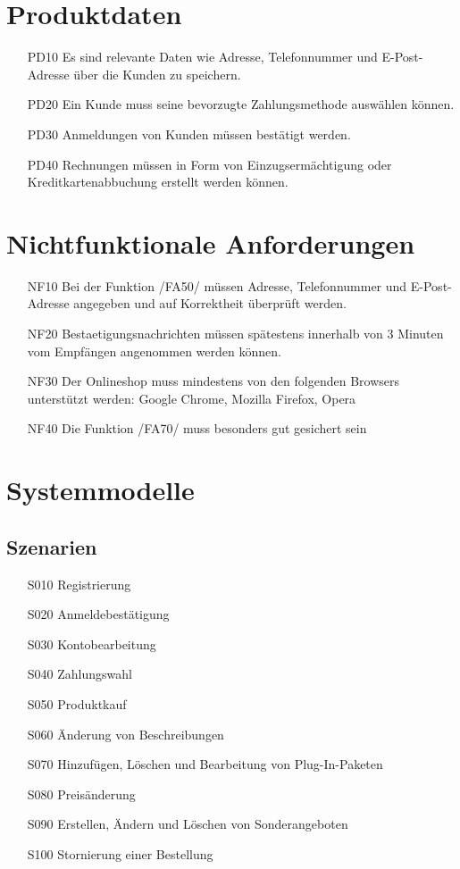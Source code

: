 \documentclass[parskip=full]{scrartcl}
\begin{document}
\section{Produktdaten}
\begin{itemize}[nosep]
\item[PD10] Es sind relevante Daten wie Adresse, Telefonnummer und E-Post-Adresse über die \gls{Kunde}n zu speichern.
\item[PD20] Ein \gls{Kunde} muss seine bevorzugte Zahlungsmethode auswählen können.
\item[PD30] Anmeldungen von \gls{Kunde}n müssen bestätigt werden.
\item[PD40] Rechnungen müssen in Form von Einzugsermächtigung oder Kreditkartenabbuchung erstellt werden können.
\end{itemize}

\section{Nichtfunktionale Anforderungen}
\begin{itemize}[nosep]
\item[NF10] Bei der Funktion /FA50/ müssen Adresse, Telefonnummer und E-Post-Adresse angegeben und auf Korrektheit überprüft werden.
\item[NF20] \gls{Bestaetigungsnachricht}en müssen spätestens innerhalb von 3 Minuten vom Empfängen angenommen werden können.
\item[NF30] Der \gls{Onlineshop} muss mindestens von den folgenden \gls{Browser}s unterstützt werden: Google Chrome, Mozilla Firefox, Opera
\item[NF40] Die Funktion /FA70/ muss besonders gut gesichert sein
\end{itemize}

\section{Systemmodelle}

\subsection{Szenarien}
\begin{itemize}[nosep]
	\item[S010] Registrierung
	\item[S020] Anmeldebestätigung
	\item[S030] Kontobearbeitung
	\item[S040] Zahlungswahl
	\item[S050] Produktkauf
	\item[S060] Änderung von Beschreibungen
	\item[S070] Hinzufügen, Löschen und Bearbeitung von \gls{Plug-In}-Paketen
	\item[S080] Preisänderung
	\item[S090] Erstellen, Ändern und Löschen von \gls{Sonderangebot}en
	\item[S100] Stornierung einer Bestellung
\end{itemize}
\end{document}

